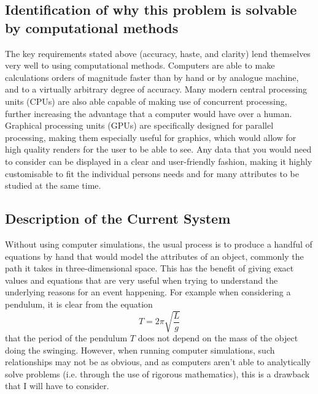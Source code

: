 \documentclass[11pt]{article}
\begin{document}
        \subsection{Identification of why this problem is solvable by computational methods}
            The key requirements stated above (accuracy, haste, and clarity) lend themselves very well to using computational methods. Computers are able to make calculations orders of magnitude faster than by hand or by analogue machine, and to a virtually arbitrary degree of accuracy. Many modern central processing units (CPUs) are also able capable of making use of concurrent processing, further increasing the advantage that a computer would have over a human. Graphical processing units (GPUs) are specifically designed for parallel processing, making them especially useful for graphics, which would allow for high quality renders for the user to be able to see. Any data that you would need to consider can be displayed in a clear and user-friendly fashion, making it highly customisable to fit the individual persons needs and for many attributes to be studied at the same time.

        \subsection{Description of the Current System}
            Without using computer simulations, the usual process is to produce a handful of equations by hand that would model the attributes of an object, commonly the path it takes in three-dimensional space. This has the benefit of giving exact values and equations that are very useful when trying to understand the underlying reasons for an event happening. For example when considering a pendulum, it is clear from the equation $$ T = 2 \pi \sqrt{\frac{L}{g}} $$ that the period of the pendulum $T$ does not depend on the mass of the object doing the swinging. However, when running computer simulations, such relationships may not be as obvious, and as computers aren't able to analytically solve problems (i.e. through the use of rigorous mathematics), this is a drawback that I will have to consider.
            
\end{document}
